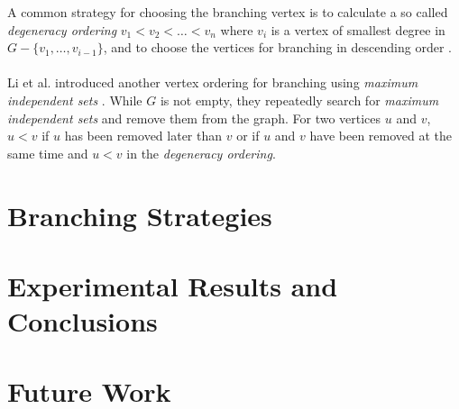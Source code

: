 \documentclass[]{article}
\begin{document}
A common strategy for choosing the branching vertex is to calculate a so called \textit{degeneracy ordering} $v_1 < v_2 < \dots < v_n$ where $v_i$ is a vertex of smallest degree in $G - \{v_1, \dots, v_{i-1} \}$, and to choose the vertices for branching in descending order \cite{CarraghanPardalos}.\\\\
Li et al. introduced another vertex ordering for branching using \textit{maximum independent sets} \cite{LiFangXu}. While $G$ is not empty, they repeatedly search for \textit{maximum independent sets} and remove them from the graph. For two vertices $u$ and $v$, $u < v$ if $u$ has been removed later than $v$ or if $u$ and $v$ have been removed at the same time and $u < v$ in the \textit{degeneracy ordering}. 

\newpage
\section{Branching Strategies} \label{sec4}
\section{Experimental Results and Conclusions} \label{sec5}
\section{Future Work} \label{sec6}
\newpage




\end{document}
